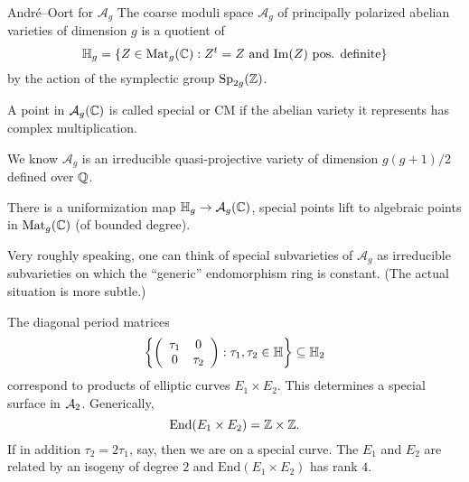 \documentclass{beamer}
\begin{document}
\begin{frame}{Andr\'e--Oort for $\mathcal{A}_g$}
  The coarse moduli space $\mathcal{A}_g$ of principally polarized abelian varieties
  of dimension $g$ is a quotient of
  \begin{equation*}
    {\mathbb{H}}_g = \{Z\in \mathrm{Mat}_{g}({{\mathbb{C}}}) : Z^t = Z \text{ and }
    \mathrm{Im}(Z) \text{ pos. definite}\}
  \end{equation*}
  by the action of the symplectic group $\mathrm{Sp}_{2g}({\mathbb{Z}})$.
  
  \begin{definition}
    A point in $\mathcal{A}_g({\mathbb{C}})$ is called \alert{special} or
    \alert{CM}
    if the abelian
    variety  it represents has complex
    multiplication. 
  \end{definition}

  We know $\mathcal{A}_g$ is an irreducible quasi-projective variety of
  dimension $g(g+1)/2$ defined over ${\mathbb{Q}}$.
  
  There is a uniformization map
    ${\mathbb{H}}_g \rightarrow \mathcal{A}_g({\mathbb{C}})$,
  special points lift to algebraic points in $\mathrm{Mat}_{g}({{\mathbb{C}}})$ (of
  bounded degree).
\end{frame}

\begin{frame}
  Very roughly speaking, one can think of special subvarieties of
  $\mathcal{A}_g$ as irreducible subvarieties on which the ``generic''
  endomorphism ring is constant. (The actual situation is more
  subtle.)

  \begin{example}[Abelian surfaces, so $g=2$,  here $\dim \cA_2=3$]
    The diagonal period matrices
    \begin{equation*}
      \left\{\left( \begin{array}{cc} {\tau_1} & {0} \\ {0} & {\tau_2} \end{array} \right) : \tau_1,\tau_2\in{\mathbb{H}}
      \right\} \subseteq {\mathbb{H}}_2
    \end{equation*}
    correspond to products of elliptic curves $E_1\times E_2$. This
    determines 
    a \alert{special surface} in ${\mathcal A}_2$. Generically, 
    \begin{equation*}
      \mathrm{End}(E_1\times E_2) ={\mathbb{Z}}\times{\mathbb{Z}}. 
    \end{equation*}
    If in addition $\tau_2=2\tau_1$, say, then we are on a \alert{special curve}.
    The $E_1$ and $E_2$ are related by an isogeny of degree $2$
    and $\mathrm{End}(E_1\times E_2)$ has rank $4$. 
  \end{example}
\end{frame}
\end{document}
